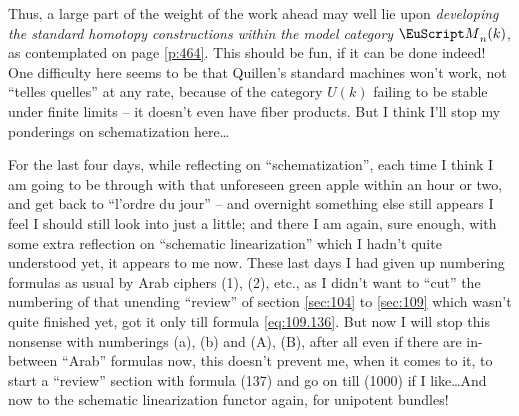 Thus, a large part of the weight of the work ahead may well lie upon
\emph{developing the standard homotopy constructions within the model
  category $\scrM_n(k)$}, as contemplated on page \ref{p:464}. This
should be fun, if it can be done indeed! One difficulty here seems to
be that Quillen's standard machines won't work, not ``telles quelles''
at any rate, because of the category $U(k)$ failing to be stable under
finite limits -- it doesn't even have fiber products. But I think I'll
stop my ponderings on schematization here\dots

\bigbreak

\noindent\hfill{}\par

\label{sec:115}%
For the last four days, while reflecting on ``schematization'', each
time I think I am going to be through with that unforeseen green apple
within an hour or two, and get back to ``l'ordre du jour'' -- and
overnight something else still appears I feel I should still look into
just a little; and there I am again, sure enough, with some extra
reflection on ``schematic linearization'' which I hadn't quite
understood yet, it appears to me now. These last days I had given up
numbering formulas as usual by Arab ciphers (1), (2), etc., as I
didn't want to ``cut'' the numbering of that unending ``review'' of
section \ref{sec:104} to \ref{sec:109} which wasn't quite finished
yet, got it only till formula \eqref{eq:109.136}. But now I will stop
this nonsense with numberings (a), (b) and (A), (B), after all even if
there are in-between ``Arab'' formulas now, this doesn't prevent me,
when it comes to it, to start a ``review'' section with formula (137)
and go on till (1000) if I like\dots  And now to the schematic
linearization functor again, for unipotent bundles!

